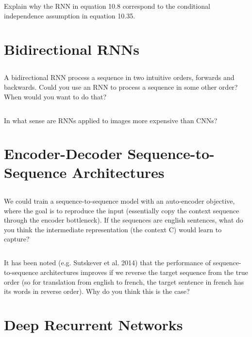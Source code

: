 \documentclass[a4paper]{report} \usepackage{amsmath}
\begin{document}
    \subsection{}
    Explain why the RNN in equation 10.8 correspond to the conditional
    independence assumption in equation 10.35.

    \section{Bidirectional RNNs}
    \subsection{}
    A bidirectional RNN process a sequence in two intuitive orders,
    forwards and backwards. Could you use an RNN to process a sequence
    in some other order? When would you want to do that?
    \subsection{}
    In what sense are RNNs applied to images more expensive than CNNs?

    \section{Encoder-Decoder Sequence-to-Sequence Architectures}
    \subsection{}
    We could train a sequence-to-sequence model with an auto-encoder
    objective, where the goal is to reproduce the input (essentially
    copy the context sequence through the encoder bottleneck).  If the
    sequences are english sentences, what do you think the
    intermediate representation (the context C) would learn to
    capture?
    \subsection{}
    It has been noted (e.g. Sutskever et al. 2014) that the
    performance of sequence-to-sequence architectures improves if we
    reverse the target sequence from the true order (so for
    translation from english to french, the target sentence in french
    has its words in reverse order). Why do you think this is the
    case?
    \section{Deep Recurrent Networks}
\end{document}
